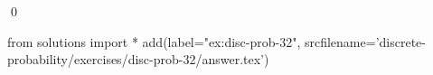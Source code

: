 
\begin{ex} 
  \label{ex:disc-prob-32}
  
  \qed
\end{ex} 
\begin{python0}
from solutions import *
add(label="ex:disc-prob-32",
    srcfilename='discrete-probability/exercises/disc-prob-32/answer.tex') 
\end{python0}
